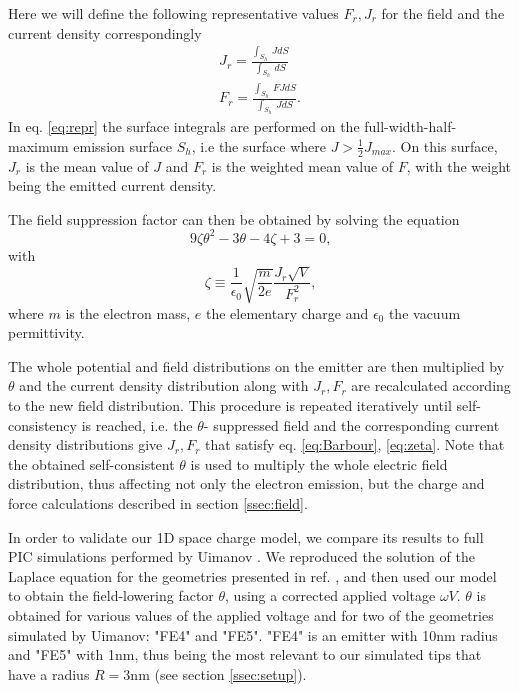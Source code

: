 \documentclass[%
 aps,
 prb,%
 amsmath,amssymb,
reprint,%
superscriptaddress,
]{revtex4-1}
\begin{document}
Here we will define the following representative values $F_r,J_r$  for the field and the current density correspondingly
\begin{eqnarray} \label{eq:repr}
\displaystyle
	J_r = \frac{\int_{S_h} ~ JdS}{ \int_{S_h} ~ dS} \nonumber \\
	F_r =  \frac{\int_{S_h} ~ FJdS}{ \int_{S_h} ~ JdS} \textrm{.} 
\end{eqnarray}
In eq. \eqref{eq:repr} the surface integrals are performed on the full-width-half-maximum emission surface $S_h$, i.e the surface where $J>\frac{1}{2}J_{max}$.
On this surface, $J_r$ is the mean value of $J$ and $F_r$ is the weighted mean value of $F$, with the weight being the emitted current density. 

The field suppression factor can then be obtained by solving the equation \cite{ForbesSpace}
\begin{equation} \label{eq:Barbour}
	9\zeta \theta^2 -3 \theta -4 \zeta +3 = 0 \textrm{,}
\end{equation}
with 
\begin{equation} \label{eq:zeta}
	\zeta \equiv \frac{1}{\epsilon_0} \sqrt{\frac{m}{2e}} \frac{J_r \sqrt{V}}{F_r^2} \textrm{,}
\end{equation}
where $m$ is the electron mass, $e$ the elementary charge and $\epsilon_0$ the vacuum permittivity.
 
The whole potential and field distributions on the emitter are then multiplied by $\theta$ and the current density distribution along with $J_r,F_r$ are recalculated according to the new  field distribution.
This procedure is repeated iteratively until self-consistency is reached, i.e. the $\theta$- suppressed field and the corresponding current density distributions give $J_r,F_r$ that satisfy eq. \eqref{eq:Barbour}, \eqref{eq:zeta}. 
Note that the obtained self-consistent $\theta$ is used to multiply the whole electric field distribution, thus affecting not only the electron emission, but the charge and force calculations described in section \ref{ssec:field}.
 
In order to validate our 1D space charge model, we compare its results to full PIC simulations performed by Uimanov \cite{Uimanov2011}.
We reproduced the solution of the Laplace equation for the geometries presented in ref. \cite{Uimanov2011}, and then used our model to obtain the field-lowering factor $\theta$, using a corrected applied voltage $\omega V$. $\theta$ is obtained for various values of the applied voltage and for two of the geometries simulated by Uimanov: "FE4" and "FE5". "FE4" is an emitter with 10nm radius and "FE5" with 1nm, thus being the most relevant to our simulated tips that have a radius $R=3$nm (see section \ref{ssec:setup}). 
\end{document}
